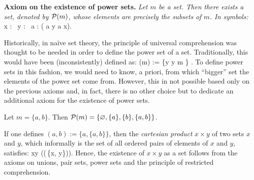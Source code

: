 \textbf{Axiom on the existence of power sets.} \emph{Let $m$ be a set. Then there exists a set, denoted by
$\mathcal{P}(m)$, whose elements are precisely the subsets of $m$. In symbols:}
\bse
\forall \, x : \exists \, y : \forall \, a : ( a \in y \eqv a \se x).
\ese

Historically, in na\"ive set theory, the principle of universal comprehension
was thought to be needed in order to define the power set of a set.
Traditionally, this would have been (inconsistently) defined as:
\bse
\cP (m) := \{y \mid y \se m \} .
\ese
To define power sets in this fashion, we would need to know, a priori, from
which ``bigger'' set the elements of the power set come from. However, this in
not possible based only on the previous axioms and, in fact, there is no other
choice but to dedicate an additional axiom for the existence of power sets.

\be
Let $m = \{a,b\}$. Then $\mathcal{P}(m)=\{\varnothing,\{a\},\{b\},\{a,b\}\}$.
\ee

\br
If one defines $(a,b) := \{a,\{a,b\}\}$, then the \emph{cartesian product} $x
\times y$ of two sets $x$ and $y$, which informally is the set of all ordered
pairs of elements of $x$ and $y$, satisfies:
\bse
x\times y \se \cP(\cP(\bigcup\,\{x, y\})).
\ese
Hence, the existence of $x\times y$ as a set follows from the axioms on
unions, pair sets, power sets and the principle of restricted comprehension.
\er

